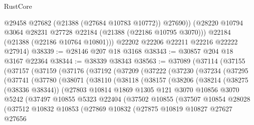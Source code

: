 \begin{lexlean}{RustCore}
\begin{coremodule}
            @29458
            @27682
            (@21388 (@27684 @10783 @10772))
            @27690))
        (@28220 @10794 @3064 @28231 @27728 @22184 (@21388 (@22186 @10795 @3070)))
        @22184
        (@21388 (@22186 @10764 @10801)))
      @22202
      @22206
      @22211
      @22216
      @22222
      @27914)
@38339 := @28146 @207 @18 @3168
@38343 := @30857 @204 @18 @3167 @22364
@38344 := @38339 @38343
@38563 := @37089
    (@37114
      (@37155
        (@37157
          (@37159
            (@37176
              (@37192
                (@37209
                  (@37222
                    (@37230
                      (@37234
                        (@37295
                          (@37741
                            (@37780
                              (@38071
                                (@38110
                                  (@38118
                                    (@38157
                                      (@38206
                                        (@38214
                                          (@38275 (@38336 @38344))
                                          (@27803
                                            @10814
                                            @1869
                                            @1305
                                            @121
                                            @3070
                                            @10856
                                            @3070
                                            @5242
                                            (@37497
                                              @10855
                                              @5323
                                              @22404
                                              (@37502
                                                @10855
                                                (@37507
                                                  @10854
                                                  @28028
                                                  (@37512
                                                    @10832
                                                    @10853
                                                    (@27869
                                                      @10832
                                                      (@27875
                                                        @10819
                                                        @10827
                                                        @27627
                                                        @27656

\end{coremodule}
\end{lexlean}
